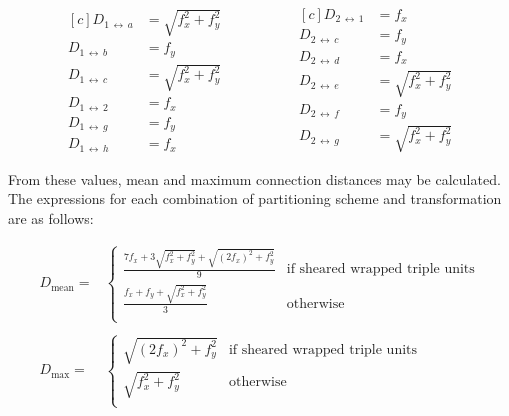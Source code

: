 			\begin{equation*}
				\begin{aligned}[c]
					D_{1\,\leftrightarrow{}\,a} &= \sqrt{f_x^2 + f_y^2} \\
					D_{1\,\leftrightarrow{}\,b} &= f_y \\
					D_{1\,\leftrightarrow{}\,c} &= \sqrt{f_x^2 + f_y^2} \\
					D_{1\,\leftrightarrow{}\,2} &= f_x \\
					D_{1\,\leftrightarrow{}\,g} &= f_y \\
					D_{1\,\leftrightarrow{}\,h} &= f_x
				\end{aligned}
				\hspace{2cm}
				\begin{aligned}[c]
					D_{2\,\leftrightarrow{}\,1} &= f_x \\
					D_{2\,\leftrightarrow{}\,c} &= f_y \\
					D_{2\,\leftrightarrow{}\,d} &= f_x \\
					D_{2\,\leftrightarrow{}\,e} &= \sqrt{f_x^2 + f_y^2} \\
					D_{2\,\leftrightarrow{}\,f} &= f_y \\
					D_{2\,\leftrightarrow{}\,g} &= \sqrt{f_x^2 + f_y^2}
				\end{aligned}
			\end{equation*}
			
			From these values, mean and maximum connection distances may be
			calculated. The expressions for each combination of partitioning scheme
			and transformation are as follows:
			
			\begin{align*}
				D_{\textrm{mean}}=&
					\begin{cases}
						\frac{7f_x + 3\sqrt{f_x^2 + f_y^2} + \sqrt{(2f_x)^2 + f_y^2}}{9} &
							\textrm{if sheared wrapped triple units}\\
						\frac{f_x + f_y + \sqrt{f_x^2 + f_y^2}}{3} &
							\textrm{otherwise}\\
					\end{cases} \\
				\\
				D_{\textrm{max}}=&
					\begin{cases}
						\sqrt{(2f_x)^2 + f_y^2} &
							\textrm{if sheared wrapped triple units}\\
						\sqrt{f_x^2 + f_y^2} &
							\textrm{otherwise}\\
					\end{cases}
			\end{align*}
			
